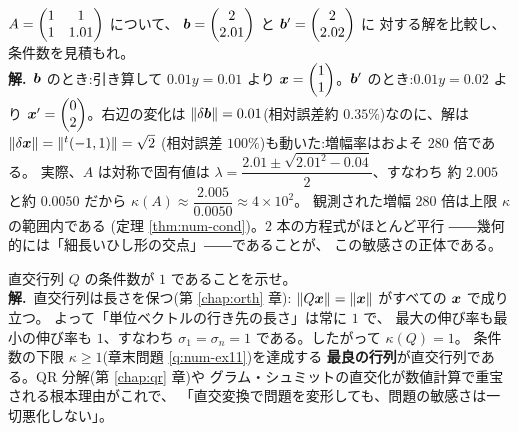 \begin{rei}[例題・標準(悪条件の体感)]\label{rei:num-std2}
$A = \begin{pmatrix}1 & 1 \\ 1 & 1.01\end{pmatrix}$ について、
$\bm{b} = \begin{pmatrix}2 \\ 2.01\end{pmatrix}$ と $\bm{b}' = \begin{pmatrix}2 \\ 2.02\end{pmatrix}$ に
対する解を比較し、条件数を見積もれ。\\
\textbf{解.}\ $\bm{b}$ のとき:引き算して $0.01y = 0.01$ より
$\bm{x} = \begin{pmatrix}1 \\ 1\end{pmatrix}$。$\bm{b}'$ のとき:$0.01y = 0.02$ より
$\bm{x}' = \begin{pmatrix}0 \\ 2\end{pmatrix}$。右辺の変化は
$\|\delta\bm{b}\| = 0.01$(相対誤差約 $0.35\%$)なのに、解は
$\|\delta\bm{x}\| = \|{}^t(-1, 1)\| = \sqrt{2}$
(相対誤差 $100\%$)も動いた:増幅率はおよそ $280$ 倍である。
実際、$A$ は対称で固有値は
$\lambda = \dfrac{2.01 \pm \sqrt{2.01^2 - 0.04}}{2}$、すなわち
約 $2.005$ と約 $0.0050$ だから
$\kappa(A) \approx \dfrac{2.005}{0.0050} \approx 4 \times 10^2$。
観測された増幅 $280$ 倍は上限 $\kappa$ の範囲内である
(定理 \ref{thm:num-cond})。$2$ 本の方程式がほとんど平行
――幾何的には「細長いひし形の交点」――であることが、
この敏感さの正体である。
\end{rei}

\begin{rei}[例題・標準(直交行列は誤差を増幅しない)]\label{rei:num-std3}
直交行列 $Q$ の条件数が $1$ であることを示せ。\\
\textbf{解.}\ 直交行列は長さを保つ(第 \ref{chap:orth} 章):
$\|Q\bm{x}\| = \|\bm{x}\|$ がすべての $\bm{x}$ で成り立つ。
よって「単位ベクトルの行き先の長さ」は常に $1$ で、
最大の伸び率も最小の伸び率も $1$、すなわち
$\sigma_1 = \sigma_n = 1$ である。したがって $\kappa(Q) = 1$。
条件数の下限 $\kappa \ge 1$(章末問題 \ref{q:num-ex11})を達成する
\textbf{最良の行列}が直交行列である。QR 分解(第 \ref{chap:qr} 章)や
グラム・シュミットの直交化が数値計算で重宝される根本理由がこれで、
「直交変換で問題を変形しても、問題の敏感さは一切悪化しない」。
\end{rei}

